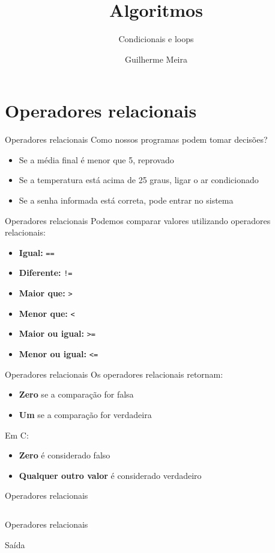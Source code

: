 \documentclass{beamer}
\title{Algoritmos} %
\subtitle{Condicionais e loops} %
\author{Guilherme Meira}
\begin{document}
  \frame{\maketitle}
\section{Operadores relacionais}
\begin{frame}{Operadores relacionais}
	Como nossos programas podem tomar decisões?
	\begin{itemize}
		\item Se a média final é menor que 5, reprovado
		\item Se a temperatura está acima de 25 graus, ligar o ar condicionado
		\item Se a senha informada está correta, pode entrar no sistema
	\end{itemize}
\end{frame}
\begin{frame}{Operadores relacionais}
	Podemos comparar valores utilizando \alert{operadores relacionais}:
	\begin{itemize}
		\item \textbf{Igual:} \texttt{==}
		\item \textbf{Diferente:} \texttt{!=}
		\item \textbf{Maior que:} \texttt{>}
		\item \textbf{Menor que:} \texttt{<}
		\item \textbf{Maior ou igual:} \texttt{>=}
		\item \textbf{Menor ou igual:} \texttt{<=}
	\end{itemize}
\end{frame}
\begin{frame}{Operadores relacionais}
	Os operadores relacionais retornam:
	\begin{itemize}
		\item \textbf{Zero} se a comparação for falsa
		\item \textbf{Um} se a comparação for verdadeira
	\end{itemize}
	Em C:
	\begin{itemize}
		\item \textbf{Zero} é considerado \alert{falso}
		\item \textbf{Qualquer outro valor} é considerado \alert{verdadeiro}
	\end{itemize}
\end{frame}
\begin{frame}{Operadores relacionais}
	\inputminted{c}{resources/relational.c}
\end{frame}
\begin{frame}{Operadores relacionais}
	\begin{block}{Saída}
		\inputminted{text}{resources/relational.txt}
	\end{block}
\end{frame}
\end{document}
